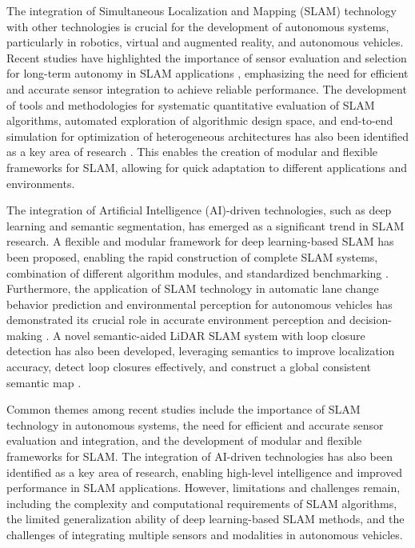 \documentclass[conference]{IEEEtran}
\begin{document}
The integration of Simultaneous Localization and Mapping (SLAM) technology with other technologies is crucial for the development of autonomous systems, particularly in robotics, virtual and augmented reality, and autonomous vehicles. Recent studies have highlighted the importance of sensor evaluation and selection for long-term autonomy in SLAM applications \cite{b1}, emphasizing the need for efficient and accurate sensor integration to achieve reliable performance. The development of tools and methodologies for systematic quantitative evaluation of SLAM algorithms, automated exploration of algorithmic design space, and end-to-end simulation for optimization of heterogeneous architectures has also been identified as a key area of research \cite{b2}. This enables the creation of modular and flexible frameworks for SLAM, allowing for quick adaptation to different applications and environments.

The integration of Artificial Intelligence (AI)-driven technologies, such as deep learning and semantic segmentation, has emerged as a significant trend in SLAM research. A flexible and modular framework for deep learning-based SLAM has been proposed, enabling the rapid construction of complete SLAM systems, combination of different algorithm modules, and standardized benchmarking \cite{b3}. Furthermore, the application of SLAM technology in automatic lane change behavior prediction and environmental perception for autonomous vehicles has demonstrated its crucial role in accurate environment perception and decision-making \cite{b4}. A novel semantic-aided LiDAR SLAM system with loop closure detection has also been developed, leveraging semantics to improve localization accuracy, detect loop closures effectively, and construct a global consistent semantic map \cite{b5}.

Common themes among recent studies include the importance of SLAM technology in autonomous systems, the need for efficient and accurate sensor evaluation and integration, and the development of modular and flexible frameworks for SLAM. The integration of AI-driven technologies has also been identified as a key area of research, enabling high-level intelligence and improved performance in SLAM applications. However, limitations and challenges remain, including the complexity and computational requirements of SLAM algorithms, the limited generalization ability of deep learning-based SLAM methods, and the challenges of integrating multiple sensors and modalities in autonomous vehicles.
\end{document}
